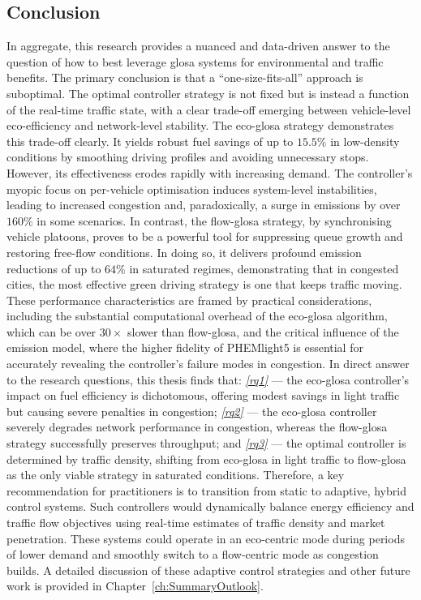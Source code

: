\subsection*{Conclusion}
In aggregate, this research provides a nuanced and data-driven answer to the question of how to best leverage \ac{glosa} systems for environmental and traffic benefits. The primary conclusion is that a \enquote{one-size-fits-all} approach is suboptimal. The optimal controller strategy is not fixed but is instead a function of the real-time traffic state, with a clear trade-off emerging between vehicle-level eco-efficiency and network-level stability.
\mynewline
The \ac{eco-glosa} strategy demonstrates this trade-off clearly. It yields robust fuel savings of up to $15.5\%$ in low-density conditions by smoothing driving profiles and avoiding unnecessary stops. However, its effectiveness erodes rapidly with increasing demand. The controller's myopic focus on per-vehicle optimisation induces system-level instabilities, leading to increased congestion and, paradoxically, a surge in emissions by over $160\%$ in some scenarios. In contrast, the \ac{flow-glosa} strategy, by synchronising vehicle platoons, proves to be a powerful tool for suppressing queue growth and restoring free-flow conditions. In doing so, it delivers profound emission reductions of up to $64\%$ in saturated regimes, demonstrating that in congested cities, the most effective green driving strategy is one that keeps traffic moving. These performance characteristics are framed by practical considerations, including the substantial computational overhead of the \ac{eco-glosa} algorithm, which can be over $30\times$ slower than \ac{flow-glosa}, and the critical influence of the emission model, where the higher fidelity of PHEMlight5 is essential for accurately revealing the controller's failure modes in congestion.
\mynewline
In direct answer to the research questions, this thesis finds that: \textit{\vref{rq1}} --- the \ac{eco-glosa} controller's impact on fuel efficiency is dichotomous, offering modest savings in light traffic but causing severe penalties in congestion; \textit{\vref{rq2}} --- the \ac{eco-glosa} controller severely degrades network performance in congestion, whereas the \ac{flow-glosa} strategy successfully preserves throughput; and \textit{\vref{rq3}} --- the optimal controller is determined by traffic density, shifting from \ac{eco-glosa} in light traffic to \ac{flow-glosa} as the only viable strategy in saturated conditions.
\mynewline
Therefore, a key recommendation for practitioners is to transition from static to adaptive, hybrid control systems. Such controllers would dynamically balance energy efficiency and traffic flow objectives using real-time estimates of traffic density and market penetration. These systems could operate in an eco-centric mode during periods of lower demand and smoothly switch to a flow-centric mode as congestion builds. A detailed discussion of these adaptive control strategies and other future work is provided in Chapter~\vref{ch:SummaryOutlook}.